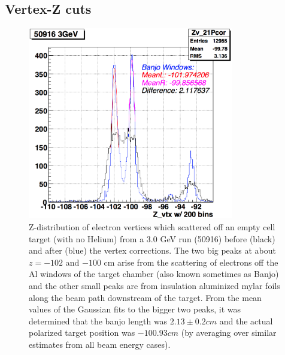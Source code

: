 \subsection{Vertex-Z cuts}
\label{vzCuts}

\begin{figure}[H]%
\centering
\leavevmode \includegraphics[width=0.8\textwidth]{figuresEG4/FigCuts/vzCuts_BanjoLength3GeV.png}  %
\caption[Banjo length fits (3.0 GeV)]{Z-distribution of electron vertices which scattered off an empty cell target (with no Helium) from a 3.0 GeV run (50916) before (black) and after (blue) the vertex corrections. The two big peaks at about $z = - 102$ and $-100$ cm arise from the scattering of electrons off the Al windows of the target chamber (also known sometimes as Banjo) and the other small peaks are from insulation aluminized mylar foils along the beam path downstream of the target. From the mean values of the Gaussian fits to the bigger two peaks, it was determined that the banjo length was $2.13 \pm 0.2 cm$ and the actual polarized target position was $-100.93 cm$ (by averaging over similar estimates from all beam energy cases). }
\label{banjoLength}
\end{figure}

